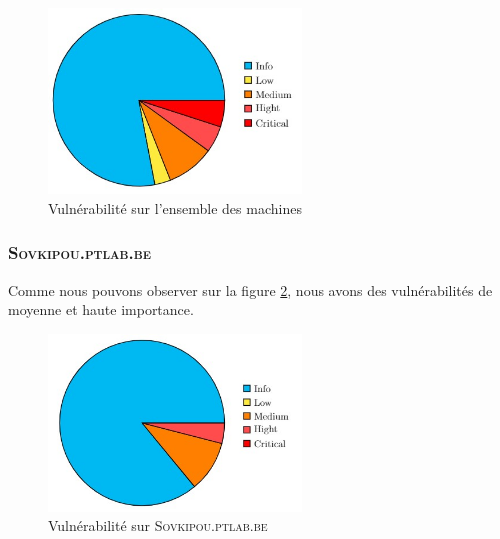 \documentclass[a4paper]{article}
\begin{document}
\begin{figure}[H]
    \centering
    \includegraphics[width=0.6\textwidth]{images/graphiques/total.jpg}
    \caption{Vulnérabilité sur l'ensemble des machines}
    \label{fig:total}
\end{figure}

















\subsubsection{\textsc{Sovkipou.ptlab.be}}\label{app:vulns1}
Comme nous pouvons observer sur la figure \ref{fig:vuln1}, nous avons des vulnérabilités de moyenne et haute importance.
\begin{figure}[H]
    \centering
    \includegraphics[width=0.6\textwidth]{images/graphiques/3.jpg}
    \caption{Vulnérabilité sur \textsc{Sovkipou.ptlab.be}}
    \label{fig:vuln1}
\end{figure}
\end{document}
